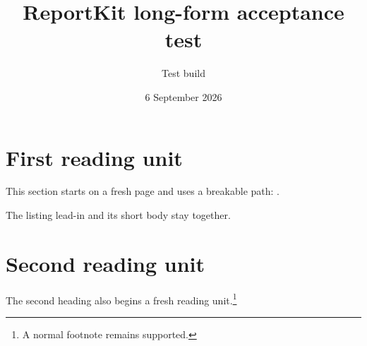 \documentclass{reportkit}
\title{ReportKit long-form acceptance test}
\author{Test build}
\date{6 September 2026}
\begin{document}
\RKFrontMatterBegin
{}
\RKContents
\RKMainMatterBegin

\section{First reading unit}
This section starts on a fresh page and uses a breakable path:
.

\begin{RKShortListing}
The listing lead-in and its short body stay together.
\end{RKShortListing}

\section{Second reading unit}
The second heading also begins a fresh reading unit.\footnote{A normal footnote remains supported.}
\end{document}
